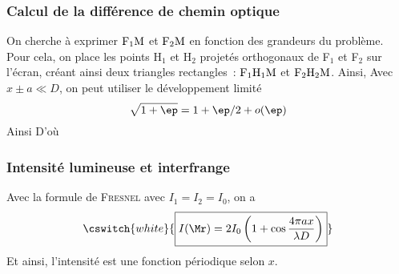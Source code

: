 \documentclass[../main/main.tex]{subfiles}
\begin{document}
\subsubsection{Calcul de la différence de chemin optique}
On cherche à exprimer $\rm F_1M$ et $\rm F_2M$ en fonction des grandeurs du
problème. Pour cela, on place les points H$_1$ et H$_2$ projetés orthogonaux de
F$_1$ et F$_2$ sur l'écran, créant ainsi deux triangles rectangles~: $\rm
F_1H_1M$ et $\rm F_2H_2M$. Ainsi,
Avec $x\pm a \ll D$, on peut utiliser le développement limité
\[\sqrt{1+\ep} = 1 + \ep/2 + o(\ep)\]
Ainsi
\vspace*{-24pt}
\vspace{-10pt}
D'où
\vspace*{-20pt}
\vspace{-10pt}

\subsubsection{Intensité lumineuse et interfrange}

Avec la formule de \textsc{Fresnel} avec $I_1 = I_2 = I_0$, on a
\[\cswitch{white}{
    \boxed{I(\Mr) = 2I_0 \left( 1 + \cos\frac{4\pi ax}{\lambda D} \right)}
}\]
Et ainsi, l'intensité est une fonction périodique selon $x$.
\end{document}
